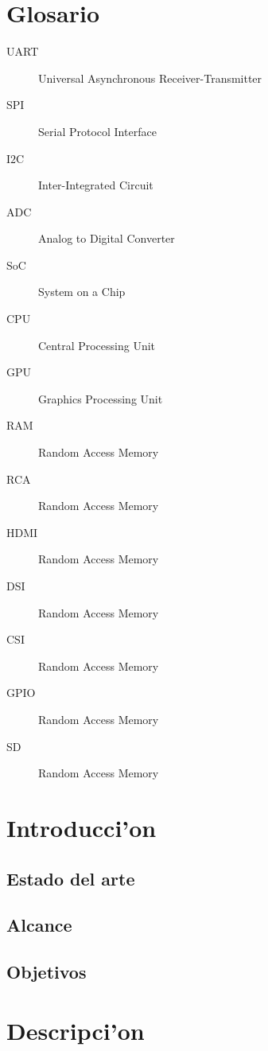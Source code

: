 \documentclass[twoside,12pt]{article}
\begin{document}
\section*{Glosario}
\begin{description}
\item[UART] Universal Asynchronous Receiver-Transmitter
\item[SPI] Serial Protocol Interface
\item[I${2}$C] Inter-Integrated Circuit
\item[ADC] Analog to Digital Converter
\item[SoC] System on a Chip
\item[CPU] Central Processing Unit
\item[GPU] Graphics Processing Unit
\item[RAM] Random Access Memory
\item[RCA] Random Access Memory
\item[HDMI] Random Access Memory
\item[DSI] Random Access Memory
\item[CSI] Random Access Memory
\item[GPIO] Random Access Memory
\item[SD] Random Access Memory
\end{description}



\newpage

\section{Introducci'on}

\subsection{Estado del arte}

\subsection{Alcance}


\subsection{Objetivos}

\newpage

\section{Descripci'on }
\end{document}
